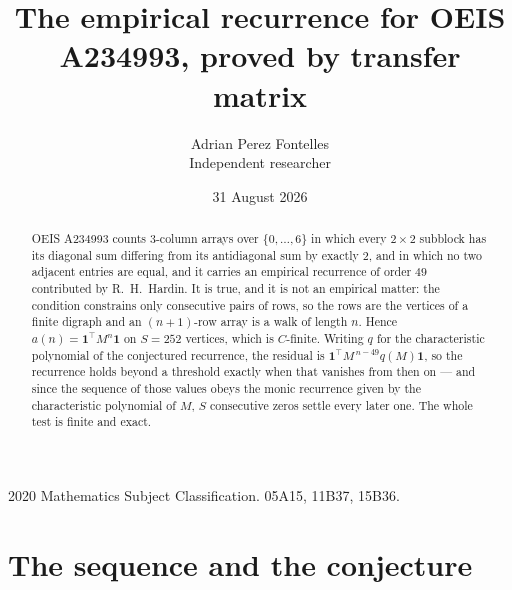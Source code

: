 \documentclass[11pt,a4paper]{article}
\title{The empirical recurrence for OEIS A234993, proved by transfer matrix}
\author{Adrian Perez Fontelles\\ \small Independent researcher}
\date{31 August 2026}
\theoremstyle{plain}
\theoremstyle{definition}
\begin{document}
\maketitle

\begin{abstract}
OEIS A234993 counts $3$-column arrays over $\{0,\dots,6\}$ in which every
$2\times2$ subblock has its diagonal sum differing from its antidiagonal sum by
exactly $2$, and in which no two adjacent entries are equal, and it
carries an empirical recurrence of order $49$ contributed by R.~H.~Hardin. It is true,
and it is not an empirical matter: the condition constrains only consecutive pairs of rows,
so the rows are the vertices of a finite digraph and an $(n+1)$-row array is a walk of
length $n$. Hence $a(n)=\mathbf{1}^{\!\top}M^{n}\mathbf{1}$ on $S=252$ vertices, which
is $C$-finite. Writing $q$ for the characteristic polynomial of the conjectured recurrence,
the residual is $\mathbf{1}^{\!\top}M^{\,n-49}q(M)\mathbf{1}$, so the recurrence
holds beyond a threshold exactly when that vanishes from then on --- and since the sequence
of those values obeys the monic recurrence given by the characteristic polynomial of $M$,
$S$ consecutive zeros settle every later one. The whole test is finite and exact.
\end{abstract}

\noindent\small 2020 Mathematics Subject Classification. 05A15, 11B37, 15B36.\normalsize

\section{The sequence and the conjecture}
\end{document}
